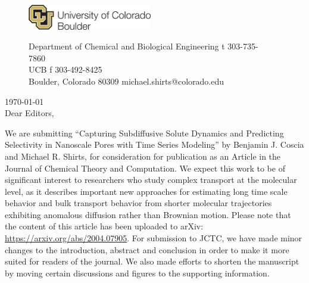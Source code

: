 \documentclass[fontsize=11pt]{article}
\begin{document}
	\graphicspath{{./figures/}}

	\begin{figure}
	\centering
	\begin{minipage}{0.37\textwidth}
	\includegraphics[width=2.14in,left]{CUBoulder.pdf}
	\end{minipage}
	\begin{minipage}{0.62\textwidth}
	\scriptsize
	\noindent Department of Chemical and Biological Engineering \hfill t 303-735-7860~~~~~~~~~~~~~~~~~~ \\
	 UCB \hfill f 303-492-8425~~~~~~~~~~~~~~~~~~ \\
	\noindent Boulder, Colorado 80309 \hfill michael.shirts@colorado.edu \\
	\end{minipage}
	\end{figure}
	
	\noindent \today \\

	\noindent Dear Editors,\\
	
	\newcommand{\ManuscriptTitle}{Capturing Subdiffusive Solute Dynamics and 
	Predicting Selectivity in Nanoscale Pores with Time Series Modeling}
	
	We are submitting ``\ManuscriptTitle'' by Benjamin J. Coscia
        and Michael R.  Shirts, for consideration for publication as
        an Article in the Journal of Chemical Theory and
        Computation. We expect this work to be of significant interest
        to researchers who study complex transport at the molecular
        level, as it describes important new approaches for estimating long
        time scale behavior and bulk transport behavior from shorter
        molecular trajectories exhibiting anomalous diffusion rather
        than Brownian motion. Please note that the content of this article
        has been uploaded to arXiv: \href{https://arxiv.org/abs/2004.07905}{https://arxiv.org/abs/2004.07905}.
        For submission to JCTC, we have made minor changes to the introduction,
        abstract and conclusion in order to make it more suited for readers of 
        the journal. We also made efforts to shorten the manuscript by moving 
        certain discussions and figures to the supporting information. \\
	
\end{document}
